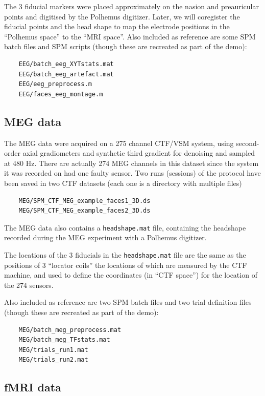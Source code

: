 The 3 fiducial markers were placed approximately on the nasion and preauricular points and digitised by the Polhemus digitizer.  Later, we will coregister the fiducial points and the head shape to map the electrode positions in the ``Polhemus space'' to the ``MRI space''.
Also included as reference are some SPM batch files and SPM scripts (though these are recreated as part of the demo):

\begin{verbatim}
    EEG/batch_eeg_XYTstats.mat
    EEG/batch_eeg_artefact.mat
    EEG/eeg_preprocess.m
    EEG/faces_eeg_montage.m
\end{verbatim}


\subsection{MEG data}

The MEG data were acquired on a 275 channel CTF/VSM system, using second-order axial gradiometers and synthetic third gradient for denoising and sampled at 480 Hz. There are actually 274 MEG channels in this dataset since the system it was recorded on had one faulty sensor. Two runs (sessions) of the protocol have been saved in two CTF datasets (each one is a directory with multiple files) 
\begin{verbatim}
    MEG/SPM_CTF_MEG_example_faces1_3D.ds
    MEG/SPM_CTF_MEG_example_faces2_3D.ds
\end{verbatim}
The MEG data also contains a \texttt{headshape.mat} file, containing the headshape recorded during the MEG experiment with a Polhemus digitizer.

The locations of the 3 fiducials in the \texttt{headshape.mat} file are the same as the positions of 3 ``locator coils'' the locations of which are measured by the CTF machine, and used to define the coordinates (in ``CTF space'') for the location of the 274 sensors.

Also included as reference are two SPM batch files and two trial definition files (though these are recreated as part of the demo):
\begin{verbatim}
    MEG/batch_meg_preprocess.mat
    MEG/batch_meg_TFstats.mat
    MEG/trials_run1.mat
    MEG/trials_run2.mat
\end{verbatim}

\subsection{fMRI data}

